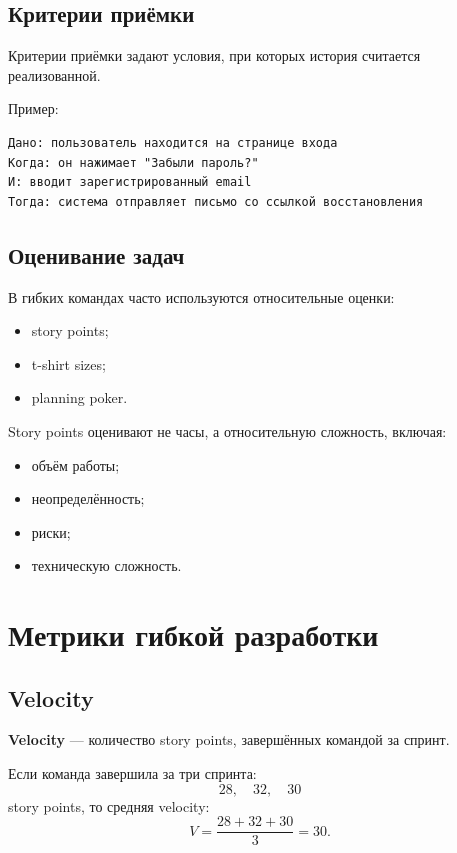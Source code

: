 \documentclass[12pt,a4paper]{article}
\begin{document}
\subsection{Критерии приёмки}

Критерии приёмки задают условия, при которых история считается реализованной.

Пример:

\begin{verbatim}
Дано: пользователь находится на странице входа
Когда: он нажимает "Забыли пароль?"
И: вводит зарегистрированный email
Тогда: система отправляет письмо со ссылкой восстановления
\end{verbatim}

\subsection{Оценивание задач}

В гибких командах часто используются относительные оценки:
\begin{itemize}
    \item story points;
    \item t-shirt sizes;
    \item planning poker.
\end{itemize}

Story points оценивают не часы, а относительную сложность, включая:
\begin{itemize}
    \item объём работы;
    \item неопределённость;
    \item риски;
    \item техническую сложность.
\end{itemize}

\section{Метрики гибкой разработки}

\subsection{Velocity}

\textbf{Velocity} --- количество story points, завершённых командой за спринт.

Если команда завершила за три спринта:
\[
28,\quad 32,\quad 30
\]
story points, то средняя velocity:
\[
V = \frac{28 + 32 + 30}{3} = 30.
\]
\end{document}
